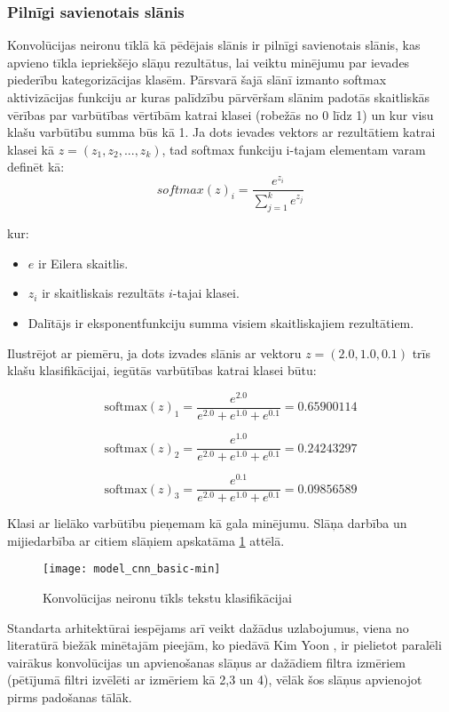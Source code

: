 \subsubsection{Pilnīgi savienotais slānis}
Konvolūcijas neironu tīklā kā pēdējais slānis ir pilnīgi savienotais slānis, kas apvieno tīkla iepriekšējo slāņu rezultātus, lai veiktu minējumu par ievades piederību kategorizācijas klasēm. Pārsvarā šajā slānī izmanto softmax aktivizācijas funkciju ar kuras palīdzību pārvēršam slānim padotās skaitliskās vērības par varbūtības vērtībām katrai klasei (robežās no 0 līdz 1) un kur visu klašu varbūtību summa būs kā 1. Ja dots ievades vektors ar rezultātiem katrai klasei kā \(z = (z_1, z_2, ..., z_k)\), tad softmax funkciju i-tajam elementam varam definēt kā:
\begin{equation}
softmax(z)_i = \frac{e^{z_i}}{\sum_{j=1}^{k} e^{z_j}}
\end{equation}

\noindent kur:
\begin{itemize}
\item \(e\) ir Eilera skaitlis.
\item \(z_i\) ir skaitliskais rezultāts \(i\)-tajai klasei.
\item Dalītājs ir eksponentfunkciju summa visiem skaitliskajiem rezultātiem.
\end{itemize}

Ilustrējot ar piemēru, ja dots izvades slānis ar vektoru \(z = (2.0, 1.0, 0.1)\) trīs klašu klasifikācijai, iegūtās varbūtības katrai klasei būtu:

\[ \text{softmax}(z)_1 = \frac{e^{2.0}}{e^{2.0} + e^{1.0} + e^{0.1}} = 0.65900114\]

\[ \text{softmax}(z)_2 = \frac{e^{1.0}}{e^{2.0} + e^{1.0} + e^{0.1}} = 0.24243297\]

\[ \text{softmax}(z)_3 = \frac{e^{0.1}}{e^{2.0} + e^{1.0} + e^{0.1}} = 0.09856589\]

Klasi ar lielāko varbūtību pieņemam kā gala minējumu. Slāņa darbība un mijiedarbība ar citiem slāņiem apskatāma \ref{fig:model_cnn_basic} attēlā.

\begin{figure}[H]
	\texttt{[image: model\_cnn\_basic-min]}
	\caption{Konvolūcijas neironu tīkls tekstu klasifikācijai \cite{TextCNNLena}}
	\label{fig:model_cnn_basic}
\end{figure}

Standarta arhitektūrai iespējams arī veikt dažādus uzlabojumus, viena no literatūrā biežāk minētajām pieejām, ko piedāvā Kim Yoon \cite{kimYoonCNN}, ir pielietot paralēli vairākus konvolūcijas un apvienošanas slāņus ar dažādiem filtra izmēriem (pētījumā filtri izvēlēti ar izmēriem kā 2,3 un 4), vēlāk šos slāņus apvienojot pirms padošanas tālāk.

